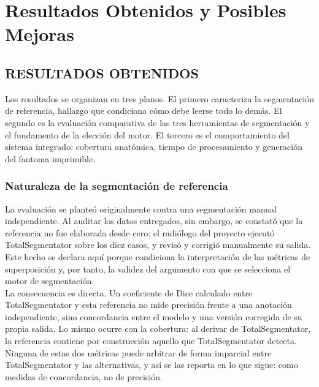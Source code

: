 \chapter{Resultados Obtenidos y Posibles Mejoras}
\label{ch:resultados}

\newcommand{\tPreproc}{4,2 min}
\newcommand{\tEnvio}{27 s}
\newcommand{\tSeg}{4,3 min}
\newcommand{\tLocal}{15,1 min}
\newcommand{\tSlicer}{4,9 min}
\newcommand{\tExport}{1,5 min}
\newcommand{\tOtros}{8 s}
\newcommand{\tTotal}{30,5 min}

\section{RESULTADOS OBTENIDOS}

Los resultados se organizan en tres planos. El primero caracteriza la segmentación de referencia, hallazgo que condiciona cómo debe leerse todo lo demás. El segundo es la evaluación comparativa de las tres herramientas de segmentación y el fundamento de la elección del motor. El tercero es el comportamiento del sistema integrado: cobertura anatómica, tiempo de procesamiento y generación del fantoma imprimible.\\

\subsection{Naturaleza de la segmentación de referencia}

La evaluación se planteó originalmente contra una segmentación manual independiente. Al auditar los datos entregados, sin embargo, se constató que la referencia no fue elaborada desde cero: el radiólogo del proyecto ejecutó TotalSegmentator sobre los diez casos, y revisó y corrigió manualmente su salida. Este hecho se declara aquí porque condiciona la interpretación de las métricas de superposición y, por tanto, la validez del argumento con que se selecciona el motor de segmentación.\\

La consecuencia es directa. Un coeficiente de Dice calculado entre TotalSegmentator y esta referencia no mide precisión frente a una anotación independiente, sino concordancia entre el modelo y una versión corregida de su propia salida. Lo mismo ocurre con la cobertura: al derivar de TotalSegmentator, la referencia contiene por construcción aquello que TotalSegmentator detecta. Ninguna de estas dos métricas puede arbitrar de forma imparcial entre TotalSegmentator y las alternativas, y así se las reporta en lo que sigue: como medidas de concordancia, no de precisión.\\

